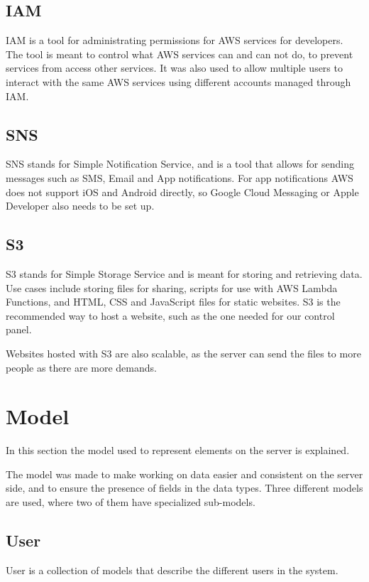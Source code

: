 \subsection{IAM}
IAM is a tool for administrating permissions for AWS services for developers. The tool is meant to control what AWS services can and can not do, to prevent services from access other services.
It was also used to allow multiple users to interact with the same AWS services using different accounts managed through IAM.

\subsection{SNS}
SNS stands for Simple Notification Service, and is a tool that allows for sending messages such as SMS, Email and App notifications. For app notifications AWS does not support iOS and Android directly, so Google Cloud Messaging or Apple Developer also needs to be set up.

\subsection{S3} \label{s3}
S3 stands for Simple Storage Service and is meant for storing and retrieving data. Use cases include storing files for sharing, scripts for use with AWS Lambda Functions, and HTML, CSS and JavaScript files for static websites. S3 is the recommended way to host a website, such as the one needed for our control panel. %

Websites hosted with S3 are also scalable, as the server can send the files to more people as there are more demands.

\section{Model}\label{model}
In this section the model used to represent elements on the server is explained.

The model was made to make working on data easier and consistent on the server side, and to ensure the presence of fields in the data types. Three different models are used, where two of them have specialized sub-models.

\subsection{User}
User is a collection of models that describe the different users in the system.

